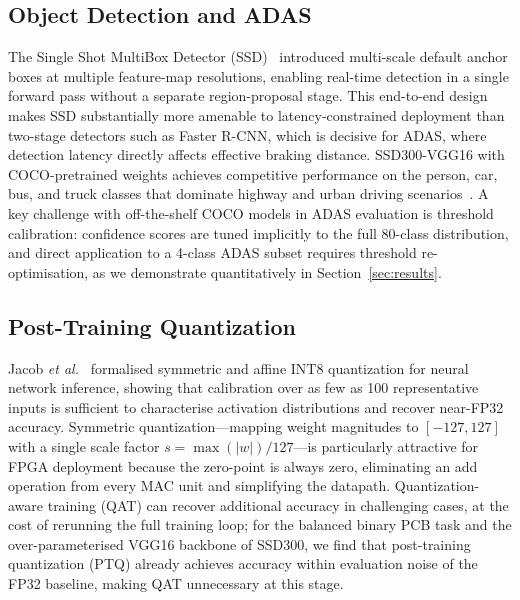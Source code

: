 \documentclass[conference]{IEEEtran}
\begin{document}
\subsection{Object Detection and ADAS}
The Single Shot MultiBox Detector (SSD)~\cite{liu2016ssd} introduced multi-scale default anchor boxes at multiple feature-map resolutions, enabling real-time detection in a single forward pass without a separate region-proposal stage. This end-to-end design makes SSD substantially more amenable to latency-constrained deployment than two-stage detectors such as Faster R-CNN, which is decisive for ADAS, where detection latency directly affects effective braking distance. SSD300-VGG16 with COCO-pretrained weights achieves competitive performance on the person, car, bus, and truck classes that dominate highway and urban driving scenarios~\cite{lin2014coco}. A key challenge with off-the-shelf COCO models in ADAS evaluation is threshold calibration: confidence scores are tuned implicitly to the full 80-class distribution, and direct application to a 4-class ADAS subset requires threshold re-optimisation, as we demonstrate quantitatively in Section~\ref{sec:results}.

\subsection{Post-Training Quantization}
Jacob \emph{et al.}~\cite{jacob2018quantization} formalised symmetric and affine INT8 quantization for neural network inference, showing that calibration over as few as 100 representative inputs is sufficient to characterise activation distributions and recover near-FP32 accuracy. Symmetric quantization---mapping weight magnitudes to $[-127, 127]$ with a single scale factor $s = \max(|w|)/127$---is particularly attractive for FPGA deployment because the zero-point is always zero, eliminating an add operation from every MAC unit and simplifying the datapath. Quantization-aware training (QAT) can recover additional accuracy in challenging cases, at the cost of rerunning the full training loop; for the balanced binary PCB task and the over-parameterised VGG16 backbone of SSD300, we find that post-training quantization (PTQ) already achieves accuracy within evaluation noise of the FP32 baseline, making QAT unnecessary at this stage.
\end{document}
